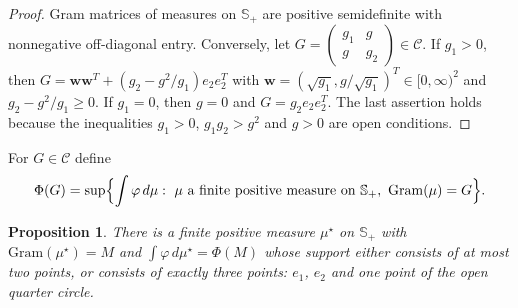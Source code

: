 \documentclass[11pt]{amsart}
\newtheorem{proposition}[theorem]{Proposition}
\theoremstyle{definition}
\theoremstyle{remark}
\numberwithin{equation}{section}
\newcommand{\cC}{\mathcal{C}}
\newcommand{\Sp}{\mathbb{S}_+}
\begin{document}
\begin{proof}
Gram matrices of measures on $\Sp$ are positive semidefinite with nonnegative off-diagonal entry. Conversely, let $G=\begin{pmatrix}g_1&g\\ g&g_2\end{pmatrix}\in\cC$. If $g_1>0$, then $G=\mathbf{w}\mathbf{w}^T+(g_2-g^2/g_1)e_2e_2^T$ with $\mathbf{w}=(\sqrt{g_1},g/\sqrt{g_1})^T\in[0,\infty)^2$ and $g_2-g^2/g_1\ge0$. If $g_1=0$, then $g=0$ and $G=g_2e_2e_2^T$. The last assertion holds because the inequalities $g_1>0$, $g_1g_2>g^2$ and $g>0$ are open conditions.
\end{proof}

For $G\in\cC$ define
\[
\Phi(G)=\sup\Bigl\{\int\varphi\,d\mu:\ \mu\text{ a finite positive measure on }\Sp,\ \mathrm{Gram}(\mu)=G\Bigr\}.
\]

\begin{proposition}\label{prop:rays}
There is a finite positive measure $\mu^\star$ on $\Sp$ with $\mathrm{Gram}(\mu^\star)=M$ and $\int\varphi\,d\mu^\star=\Phi(M)$ whose support either consists of at most two points, or consists of exactly three points: $e_1$, $e_2$ and one point of the open quarter circle.
\end{proposition}
\end{document}
